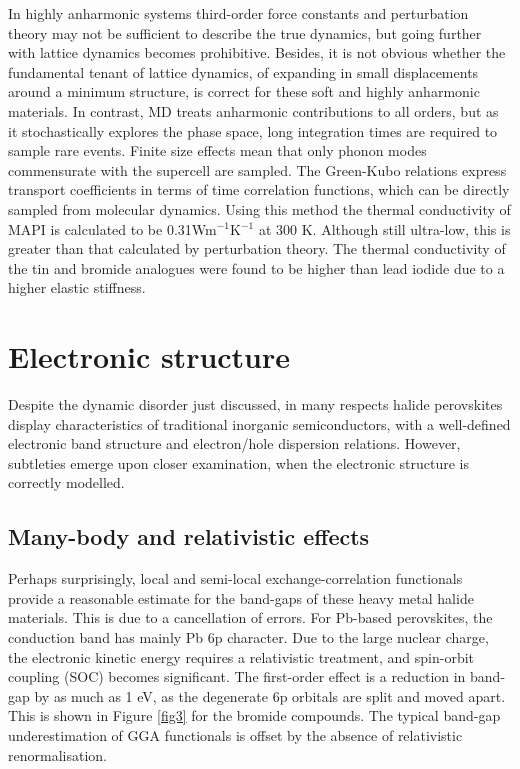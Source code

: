 In highly anharmonic systems third-order force constants and perturbation theory may not be sufficient
to describe the true dynamics, but going further with lattice dynamics becomes prohibitive.
Besides, it is not obvious whether the fundamental tenant of lattice dynamics, of expanding in small displacements around a minimum structure, is correct for these soft and highly anharmonic materials. 
In contrast, MD treats anharmonic contributions to all orders, but as it stochastically explores the phase space, long integration times are required to sample rare events. 
Finite size effects mean that only phonon modes commensurate with the supercell are sampled. 
The Green-Kubo relations express transport coefficients in terms of time correlation functions, which can be directly sampled from molecular dynamics. \autocite{volz2000molecular}
Using this method the thermal conductivity of MAPI is calculated to be 0.31Wm$^{-1}$K$^{-1}$ at 300 K.\autocite{Wang2016d}
Although still ultra-low, this is greater than that calculated by perturbation theory.
The thermal conductivity of the tin and bromide analogues were found to be higher than lead iodide due to a higher elastic stiffness.\autocite{Wang2016d} 
\section{Electronic structure}

Despite the dynamic disorder just discussed, in many respects halide perovskites display characteristics of traditional inorganic semiconductors, with a well-defined electronic band structure and electron/hole dispersion relations.
However, subtleties emerge upon closer examination, when the electronic structure is correctly modelled. 

\subsection{Many-body and relativistic effects} \label{Mbre}

Perhaps surprisingly, local and semi-local exchange-correlation functionals 
provide a reasonable estimate for the band-gaps of these heavy metal halide materials.
This is due to a cancellation of errors. 
For Pb-based perovskites, the conduction band has mainly Pb 6p character. 
Due to the large nuclear charge, the electronic kinetic energy requires a relativistic
treatment, and spin-orbit coupling (SOC) becomes significant. 
The first-order effect is a reduction in band-gap by as much as 1 eV\autocite{Brivio2014a}, as the degenerate 6p orbitals are split and moved apart. 
This is shown in Figure \ref{fig3} for the bromide compounds.
The typical band-gap underestimation of GGA functionals is offset by the absence of relativistic renormalisation.

